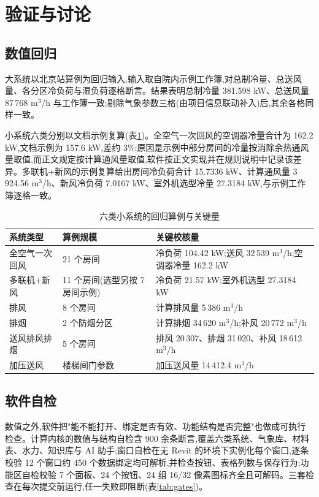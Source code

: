 \documentclass[UTF8,a4paper,zihao=-4]{ctexart}
\begin{document}
\section{验证与讨论}

\subsection{数值回归}

大系统以北京站算例为回归输入,输入取自院内示例工作簿,对总制冷量、总送风量、各分区冷负荷与湿负荷逐格断言。结果表明总制冷量 381.598 kW、总送风量 87\,768 m$^3$/h 与工作簿一致;剔除气象参数三格(由项目信息联动补入)后,其余各格同样一致。

小系统六类分别以文档示例复算(表\ref{tab:cases})。全空气一次回风的空调器冷量合计为 162.2 kW,文档示例为 157.6 kW,差约 3\%:原因是示例中部分房间的冷量按消除余热通风量取值,而正文规定按计算通风量取值,软件按正文实现并在规则说明中记录该差异。多联机+新风的示例复算给出房间冷负荷合计 15.7336 kW、计算通风量 3\,924.56 m$^3$/h、新风冷负荷 7.0167 kW、室外机选型冷量 27.3184 kW,与示例工作簿逐格一致。

\begin{table}[H]
\centering
\caption{六类小系统的回归算例与关键量}\label{tab:cases}
\small
\begin{tabular}{p{2.6cm}p{5.6cm}p{4.6cm}}
\toprule
系统类型 & 算例规模 & 关键校核量 \\
\midrule
全空气一次回风 & 21 个房间 & 冷负荷 104.42 kW;送风 32\,539 m$^3$/h;空调器冷量 162.2 kW \\
多联机+新风 & 11 个房间(选型另按 7 房间示例) & 冷负荷 21.57 kW;室外机选型 27.3184 kW \\
排风 & 8 个房间 & 计算排风量 5\,386 m$^3$/h \\
排烟 & 2 个防烟分区 & 计算排烟 34\,620 m$^3$/h;补风 20\,772 m$^3$/h \\
送风排风排烟 & 5 个房间 & 排风 20\,307、排烟 31\,020、补风 18\,612 m$^3$/h \\
加压送风 & 楼梯间门参数 & 加压送风量 14\,412.4 m$^3$/h \\
\bottomrule
\end{tabular}
\end{table}

\subsection{软件自检}

数值之外,软件把"能不能打开、绑定是否有效、功能结构是否完整"也做成可执行检查。计算内核的数值与结构自检含 900 余条断言,覆盖六类系统、气象库、材料表、水力、知识库与 AI 助手;窗口自检在无 Revit 的环境下实例化每个窗口,逐条校验 12 个窗口约 450 个数据绑定均可解析,并检查按钮、表格列数与保存行为;功能区自检校验 7 个面板、24 个按钮、24 组 16/32 像素图标齐全且可解码。三套检查在每次提交前运行,任一失败即阻断(表\ref{tab:gates})。
\end{document}
